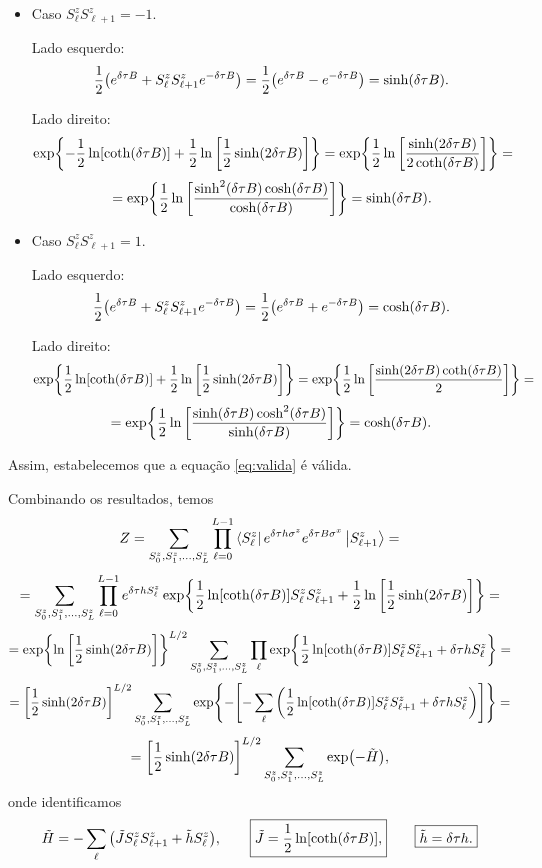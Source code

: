 \documentclass[a4paper,10pt]{article}
\begin{document}
\begin{itemize}
\item Caso $S_{\ell}^z S_{\ell+1}^z = -1$.

Lado esquerdo:
$$
\frac{1}{2} \qty(e^{\delta\tau B} + S_{\ell}^z S_{\ell+1}^z e^{-\delta\tau B}) =
\frac{1}{2} \qty(e^{\delta\tau B} - e^{-\delta\tau B}) = \sinh(\delta\tau B).
$$

Lado direito:
$$
\exp{
- \frac{1}{2} \ln[\coth(\delta\tau B)] +
\frac{1}{2} \ln\qty[\frac{1}{2} \sinh(2\delta\tau B)] } =
\exp{
\frac{1}{2} \ln\qty[ \frac{\sinh(2\delta\tau B)}{2 \coth(\delta\tau B)} ] } =
$$
$$
= \exp{
\frac{1}{2} \ln\qty[ \frac{\sinh[2](\delta\tau B) \cosh(\delta\tau B)}{\cosh(\delta\tau B)} ] } = \sinh(\delta\tau B).
$$


\item Caso $S_{\ell}^z S_{\ell+1}^z = 1$.

Lado esquerdo:
$$
\frac{1}{2} \qty(e^{\delta\tau B} + S_{\ell}^z S_{\ell+1}^z e^{-\delta\tau B}) =
\frac{1}{2} \qty(e^{\delta\tau B} + e^{-\delta\tau B}) = \cosh(\delta\tau B).
$$

Lado direito:
$$
\exp{
\frac{1}{2} \ln[\coth(\delta\tau B)] +
\frac{1}{2} \ln\qty[\frac{1}{2} \sinh(2\delta\tau B)] } =
\exp{
\frac{1}{2} \ln\qty[ \frac{\sinh(2\delta\tau B) \coth(\delta\tau B)}{2} ] } =
$$
$$
= \exp{
\frac{1}{2} \ln\qty[ \frac{\sinh(\delta\tau B) \cosh[2](\delta\tau B)}{\sinh(\delta\tau B)} ] } = \cosh(\delta\tau B).
$$
\end{itemize}

\n

Assim, estabelecemos que a equação \ref{eq:valida} é válida.

\n

Combinando os resultados, temos
$$
Z =
\sum_{S_0^z, S_1^z, \ldots, S_{L}^z}
\prod_{\ell=0}^{L-1}
\bra{S_{\ell}^z}
e^{\delta\tau h \sigma^z} e^{\delta\tau B \sigma^x}
\ket{S_{\ell+1}^z} =
$$
$$
=
\sum_{S_0^z, S_1^z, \ldots, S_{L}^z}
\prod_{\ell=0}^{L-1}
e^{\delta\tau h S_{\ell}^z}
\exp{
\frac{1}{2} \ln[\coth(\delta\tau B)] S_{\ell}^z S_{\ell+1}^z +
\frac{1}{2} \ln\qty[\frac{1}{2} \sinh(2\delta\tau B)] } =
$$
$$
= \exp{\ln\qty[\frac{1}{2} \sinh(2\delta\tau B)]}^{L/2} \sum_{S_0^z, S_1^z, \ldots, S_{L}^z}
\prod_{\ell}
\exp{
\frac{1}{2} \ln[\coth(\delta\tau B)] S_{\ell}^z S_{\ell+1}^z +
\delta\tau h S_{\ell}^z } =
$$
$$
= \qty[\frac{1}{2} \sinh(2\delta\tau B)]^{L/2} \sum_{S_0^z, S_1^z, \ldots, S_{L}^z}
\exp{ - \qty[ - \sum_{\ell}
\qty( \frac{1}{2} \ln[\coth(\delta\tau B)] S_{\ell}^z S_{\ell+1}^z +
\delta\tau h S_{\ell}^z ) ] } =
$$
$$
= \qty[\frac{1}{2} \sinh(2\delta\tau B)]^{L/2} \sum_{S_0^z, S_1^z, \ldots, S_{L}^z}
\exp( - \tilde{H} ),
$$
onde identificamos
$$
\tilde{H} =
- \sum_{\ell}
\qty( \tilde{J} S_{\ell}^z S_{\ell+1}^z +
\tilde{h} S_{\ell}^z ), \quad \quad
\boxed{\tilde{J} = \frac{1}{2} \ln[\coth(\delta\tau B)],} \quad \quad
\boxed{\tilde{h} = \delta\tau h.}
$$
\end{document}

